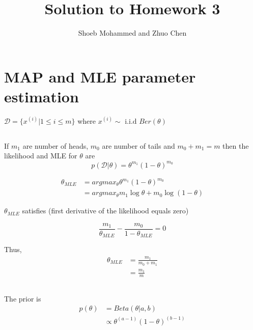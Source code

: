 \documentclass{article}
\begin{document}
\title{Solution to Homework 3}
\author{Shoeb Mohammed and Zhuo Chen}
\maketitle

\newcommand{\QEDA}{\hfill\ensuremath{\blacksquare}}
\newcommand{\QEDB}{\hfill\ensuremath{\square}}

\section{MAP and MLE parameter estimation}
$\mathcal{D} = \{x^{(i)} | 1 \leq i \leq m\}$ where $x^{(i)} \sim \text{ i.i.d } Ber(\theta)$
\subsection{}
If $m_1$ are number of heads, $m_0$ are number of tails and $m_0 + m_1 = m$ then the likelihood and MLE for $\theta$ are
\begin{equation}
  \label{eq:1.1}
  p(\mathcal{D} | \theta) = \theta^{m_1} (1-\theta)^{m_0}
\end{equation}

\begin{equation}
  \label{eq:1.2}
  \begin{split}
  \theta_{MLE} &= argmax_{\theta} \theta^{m_1} (1-\theta)^{m_0} \\
               &= argmax_{\theta} m_1 \log \theta + m_0 \log (1-\theta)
  \end{split}
\end{equation}


$\theta_{MLE}$ satisfies (first derivative of the likelihood equals zero)

\begin{equation}
  \label{eq:1.3}
    \frac{m_1}{\theta_{MLE}} - \frac{m_0}{1-\theta_{MLE}} = 0
\end{equation}

Thus, 
\begin{equation}
  \label{eq:1.4}
  \begin{split}
    \theta_{MLE} &= \frac{m_1}{m_0 + m_1} \\
                 &= \frac{m_1}{m}
  \end{split}
\end{equation}


\subsection{}
The prior is 
\begin{equation}
  \label{eq:1.5}
  \begin{split}
  p(\theta) &= Beta(\theta | a,b) \\
            &\propto \theta^{(a-1)}(1-\theta)^{(b-1)}
  \end{split}
\end{equation}
\end{document}
